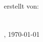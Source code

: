 \thispagestyle{plain}

\begin{titlepage}

	\begin{center}
	{}\\[35ex]
	
	{}\\[7ex]
	
	{}\\[17ex]
	
	~\\[25ex]
	erstellt von:\\
	\personName\\
	
	~\\[10ex]
	\ort, \today
	
	\end{center}
\end{titlepage}